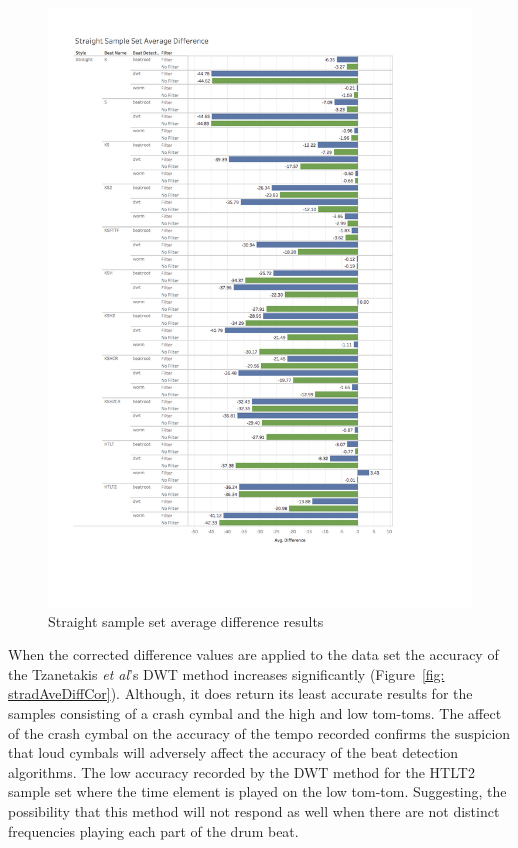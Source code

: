 \documentclass[a4paper, 11pt]{article}
\begin{document}
\begin{figure}[h]
\vspace{-1in}
\centering
\includegraphics[scale=0.38]{images/SSSAD.jpg}
\caption{Straight sample set average difference results}
\label{fig: stradAveDiff}
\end{figure}

When the corrected difference values are applied to the data set the accuracy of the Tzanetakis \textit{et al}'s \cite{tzane1} DWT method increases significantly (Figure~\ref{fig: stradAveDiffCor}). Although, it does return its least accurate results for the samples consisting of a crash cymbal and the high and low tom-toms. The affect of the crash cymbal on the accuracy of the tempo recorded confirms the suspicion that loud cymbals will adversely affect the accuracy of the beat detection algorithms. The low accuracy recorded by the DWT method for the HTLT2 sample set where the time element is played on the low tom-tom. Suggesting, the possibility that this method will not respond as well when there are not distinct frequencies playing each part of the drum beat. \par
\end{document}
